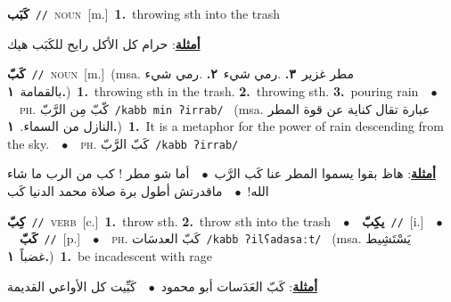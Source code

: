 \documentclass[10pt,a4paper,twoside]{article} %
\begin{document}
\begin{multicols}{2}
{{{{{{\setlength\topsep{0pt}\textbf{\foreignlanguage{arabic}{كَبَب}}\ {\color{gray}\texttt{//}\color{black}}\ \textsc{noun}\ [m.]\ \textbf{1.}~throwing sth into the trash\  \begin{flushright}\color{gray}\foreignlanguage{arabic}{\textbf{\underline{\foreignlanguage{arabic}{أمثلة}}}: حرام كل الأكل رايح للكَبَب هيك}\end{flushright}\color{black}} \vspace{2mm}

{\setlength\topsep{0pt}\textbf{\foreignlanguage{arabic}{كَبّ}}\ {\color{gray}\texttt{//}\color{black}}\ \textsc{noun}\ [m.]\ \color{gray}(msa. \foreignlanguage{arabic}{مطر غزير}~\foreignlanguage{arabic}{\textbf{٣.}}  .\foreignlanguage{arabic}{رمي شيء}~\foreignlanguage{arabic}{\textbf{٢.}}  .\foreignlanguage{arabic}{رمي شيء بالقمامة}~\foreignlanguage{arabic}{\textbf{١.}})\color{black}\ \textbf{1.}~throwing sth in the trash.  \textbf{2.}~throwing sth.  \textbf{3.}~pouring rain\ \ $\bullet$\ \ \textsc{ph.} \color{gray} \foreignlanguage{arabic}{كّبّ مِن الرَّبّ}\color{black}\ {\color{gray}\texttt{/{\sffamily kabb min ʔirrab}/}\color{black}}\ \color{gray} (msa. \foreignlanguage{arabic}{عبارة تقال كناية عن قوة المطر النازل من السماء.}~\foreignlanguage{arabic}{\textbf{١.}})\color{black}\ \textbf{1.}~It is a metaphor for the power of rain descending from the sky.\ \ $\bullet$\ \ \textsc{ph.} \color{gray} \foreignlanguage{arabic}{كَبّ الرَّبّ}\color{black}\ {\color{gray}\texttt{/{\sffamily kabb ʔirrab}/}\color{black}}\  \begin{flushright}\color{gray}\foreignlanguage{arabic}{\textbf{\underline{\foreignlanguage{arabic}{أمثلة}}}: هاظ بقوا يسموا المطر عنا كَب الرَّب\ $\bullet$\ \  أما شو مطر ! كب من الرب ما شاء الله!\ $\bullet$\ \  ماقدرتش أطول برة صلاة محمد الدنيا كَب}\end{flushright}\color{black}} \vspace{2mm}

{\setlength\topsep{0pt}\textbf{\foreignlanguage{arabic}{كِبّ}}\ {\color{gray}\texttt{//}\color{black}}\ \textsc{verb}\ [c.]\ \textbf{1.}~throw sth.  \textbf{2.}~throw sth into the trash\ \ $\bullet$\ \ \setlength\topsep{0pt}\textbf{\foreignlanguage{arabic}{يكِبّ}}\ {\color{gray}\texttt{//}\color{black}}\ [i.]\ \ $\bullet$\ \ \setlength\topsep{0pt}\textbf{\foreignlanguage{arabic}{كَبّ}}\ {\color{gray}\texttt{//}\color{black}}\ [p.]\ \ $\bullet$\ \ \textsc{ph.} \color{gray} \foreignlanguage{arabic}{كَبّ العدسَات}\color{black}\ {\color{gray}\texttt{/{\sffamily kabb ʔilʕadasaːt}/}\color{black}}\ \color{gray} (msa. \foreignlanguage{arabic}{يَسْتَشِيط غضباً}~\foreignlanguage{arabic}{\textbf{١.}})\color{black}\ \textbf{1.}~be incadescent with rage\  \begin{flushright}\color{gray}\foreignlanguage{arabic}{\textbf{\underline{\foreignlanguage{arabic}{أمثلة}}}: كَبّ العَدَسات أبو محمود\ $\bullet$\ \  كَبِّيت كل الأواعي القديمة}\end{flushright}\color{black}} \vspace{2mm}

}}}}}
\end{multicols}
\end{document}
